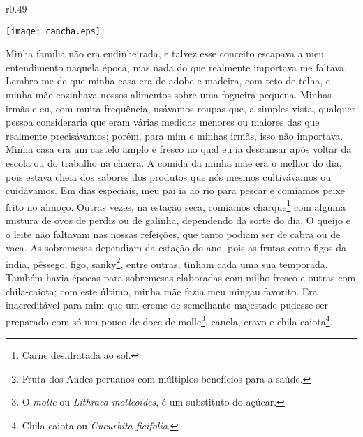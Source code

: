 \ifdefined\EnableIncludeImages
\begin{wrapfigure}{r}{0.49\textwidth}
  \begin{center}
  \vspace{-20pt}
    \texttt{[image: cancha.eps]}
  \end{center}
  \vspace{-20pt}
\end{wrapfigure}
\fi
Minha família não era endinheirada, e talvez esse conceito escapava a meu entendimento naquela época, mas nada do que realmente importava me faltava.
Lembro-me de que minha casa era de adobe e madeira, com teto de telha, e minha mãe cozinhava nossos alimentos sobre uma fogueira pequena. Minhas irmãs e eu, com muita frequência, usávamos roupas que, a simples vista, qualquer pessoa consideraria que eram várias medidas menores ou maiores das que realmente precisávamos;
porém, para mim e minhas irmãs, isso não importava. Minha casa era um castelo amplo e fresco no qual eu ia descansar após voltar da escola ou do trabalho na chacra. 
A comida da minha mãe era o melhor do dia, pois estava cheia dos sabores dos produtos que nós mesmos cultivávamos ou cuidávamos. 
Em dias especiais, meu pai ia ao rio para pescar e comíamos peixe frito no almoço. Outras vezes, na estação seca, comíamos charque\footnote{Carne desidratada ao sol.} com alguma mistura de ovos de perdiz ou de galinha, dependendo da sorte do dia.
O queijo e o leite não faltavam nas nossas refeições, que tanto podiam ser de cabra ou de vaca.
As sobremesas dependiam da estação do ano, pois as frutas como figos-da-índia, pêssego, figo, sanky\footnote{Fruta dos Andes peruanos com múltiplos benefícios para a saúde.}, entre outras, tinham cada uma sua temporada. Também havia épocas para sobremesas elaboradas com milho fresco e outras com chila-caiota; com este último, minha mãe fazia meu mingau favorito. Era inacreditável para mim que um creme de semelhante majestade pudesse ser preparado com só um pouco de doce de molle\footnote{O \textit{molle} ou \textit{Lithraea molleoides}, é um substituto do açúcar.}, canela, cravo e chila-caiota\footnote{Chila-caiota ou \textit{Cucurbita ficifolia}.}.

